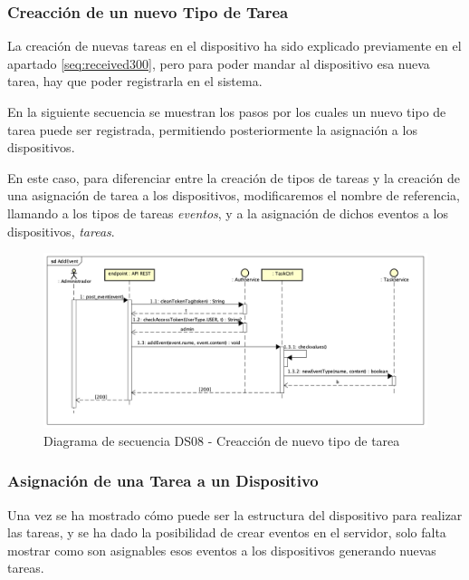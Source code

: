 \subsubsection{Creacción de un nuevo Tipo de Tarea}

La creación de nuevas tareas en el dispositivo ha sido explicado previamente en el apartado \ref{seq:received300}, pero para poder mandar al dispositivo esa nueva tarea, hay que poder registrarla en el sistema.

En la siguiente secuencia se muestran los pasos por los cuales un nuevo tipo de tarea puede ser registrada, permitiendo posteriormente la asignación a los dispositivos.

En este caso, para diferenciar entre la creación de tipos de tareas y la creación de una asignación de tarea a los dispositivos, modificaremos el nombre de referencia, llamando a los tipos de tareas  \textit{eventos}, y a la asignación de dichos eventos a los dispositivos, \textit{tareas}.

\begin{figure}[H]
    \centering
    \includegraphics[width=14cm]{./img/sequence/diagram/AddEvent.png}
    \caption{Diagrama de secuencia DS08 - Creacción de nuevo tipo de tarea}
    \label{fig:seq.NewEvent}
\end{figure}

\newpage
\subsubsection{Asignación de una Tarea a un Dispositivo}

Una vez se ha mostrado cómo puede ser la estructura del dispositivo para realizar las tareas, y se ha dado la posibilidad de crear eventos en el servidor, solo falta mostrar como son asignables esos eventos a los dispositivos generando nuevas tareas.

